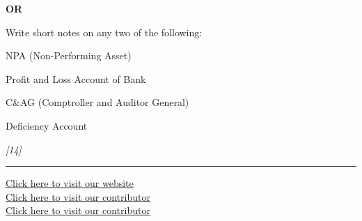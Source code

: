 \documentclass[11pt,a4paper]{article}
\newcommand{\pts}[1]{\hfill   \textit{[#1]}}
\begin{document}
\centerline{   \textbf{OR}}

Write short notes on any two of the following:

\begin{parts}
  \item NPA (Non-Performing Asset)
  \item Profit and Loss Account of Bank
  \item C\&AG (Comptroller and Auditor General)
  \item Deficiency Account
\end{parts}\pts{14}

\vfill
\rule{\linewidth}{0.4pt}

\begin{center}\small
\href{https://bhu-exam.vercel.app/}{Click here to visit our website}\\[4pt]
\href{https://me-aryan.vercel.app/}{Click here to visit our contributor}\\[4pt]
\href{https://quashan-me.vercel.app/}{Click here to visit our contributor}
\end{center}
\end{document}
